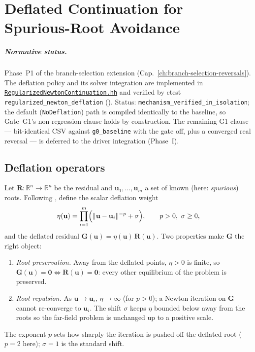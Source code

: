 
\chapter{Deflated Continuation for Spurious-Root Avoidance}
\label{ch:deflated-continuation}

\paragraph{Normative status.}
Phase~P1 of the branch-selection extension
(Cap.~\ref{ch:branch-selection-reversals}). The deflation policy and its
solver integration are implemented in
\href{run:src/analysis/RegularizedNewtonContinuation.hh}{%
\texttt{RegularizedNewtonContinuation.hh}} and verified by ctest
\texttt{regularized\_newton\_deflation}
(). Status:
\texttt{mechanism\_verified\_in\_isolation}; the default
(\texttt{NoDeflation}) path is compiled identically to the baseline, so
Gate~G1's non-regression clause holds by construction. The remaining
G1 clause --- bit-identical CSV against \texttt{g0\_baseline} with the
gate off, plus a converged real reversal --- is deferred to the driver
integration (Phase~I).

\section{Deflation operators}

Let \(\mathbf{R}:\mathbb{R}^n\to\mathbb{R}^n\) be the residual and
\(\mathbf{u}_1,\dots,\mathbf{u}_m\) a set of known (here: \emph{spurious})
roots. Following \cite{FarrellBirkissonFunke2015}, define the scalar
deflation weight
\[
  \eta(\mathbf{u})=\prod_{i=1}^{m}
      \Bigl(\lVert\mathbf{u}-\mathbf{u}_i\rVert^{-p}+\sigma\Bigr),
  \qquad p>0,\ \sigma\ge 0,
\]
and the deflated residual \(\mathbf{G}(\mathbf{u})
=\eta(\mathbf{u})\,\mathbf{R}(\mathbf{u})\). Two properties make
\(\mathbf{G}\) the right object:
%
\begin{enumerate}
  \item \emph{Root preservation.} Away from the deflated points,
        \(\eta>0\) is finite, so \(\mathbf{G}(\mathbf{u})=\mathbf{0}
        \iff \mathbf{R}(\mathbf{u})=\mathbf{0}\): every other equilibrium
        of the problem is preserved.
  \item \emph{Root repulsion.} As
        \(\mathbf{u}\to\mathbf{u}_i\), \(\eta\to\infty\) (for
        \(p>0\)); a Newton iteration on \(\mathbf{G}\) cannot re-converge
        to \(\mathbf{u}_i\). The shift \(\sigma\) keeps \(\eta\) bounded
        below away from the roots so the far-field problem is unchanged
        up to a positive scale.
\end{enumerate}
%
The exponent \(p\) sets how sharply the iteration is pushed off the
deflated root (\(p=2\) here); \(\sigma=1\) is the standard shift.

